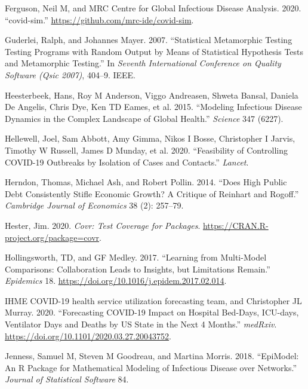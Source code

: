 \documentclass[]{elsarticle} %
\begin{document}
\leavevmode\hypertarget{ref-ferg_github}{}%
Ferguson, Neil M, and MRC Centre for Global Infectious Disease Analysis. 2020. ``covid-sim.'' \url{https://github.com/mrc-ide/covid-sim}.

\leavevmode\hypertarget{ref-guderlei2007statistical}{}%
Guderlei, Ralph, and Johannes Mayer. 2007. ``Statistical Metamorphic Testing Testing Programs with Random Output by Means of Statistical Hypothesis Tests and Metamorphic Testing.'' In \emph{Seventh International Conference on Quality Software (Qsic 2007)}, 404--9. IEEE.

\leavevmode\hypertarget{ref-heesterbeek2015modeling}{}%
Heesterbeek, Hans, Roy M Anderson, Viggo Andreasen, Shweta Bansal, Daniela De Angelis, Chris Dye, Ken TD Eames, et al. 2015. ``Modeling Infectious Disease Dynamics in the Complex Landscape of Global Health.'' \emph{Science} 347 (6227).

\leavevmode\hypertarget{ref-hellewell2020feasibility}{}%
Hellewell, Joel, Sam Abbott, Amy Gimma, Nikos I Bosse, Christopher I Jarvis, Timothy W Russell, James D Munday, et al. 2020. ``Feasibility of Controlling COVID-19 Outbreaks by Isolation of Cases and Contacts.'' \emph{Lancet}.

\leavevmode\hypertarget{ref-herndon2014does}{}%
Herndon, Thomas, Michael Ash, and Robert Pollin. 2014. ``Does High Public Debt Consistently Stifle Economic Growth? A Critique of Reinhart and Rogoff.'' \emph{Cambridge Journal of Economics} 38 (2): 257--79.

\leavevmode\hypertarget{ref-covr}{}%
Hester, Jim. 2020. \emph{Covr: Test Coverage for Packages}. \url{https://CRAN.R-project.org/package=covr}.

\leavevmode\hypertarget{ref-hollingsworth2017learning}{}%
Hollingsworth, TD, and GF Medley. 2017. ``Learning from Multi-Model Comparisons: Collaboration Leads to Insights, but Limitations Remain.'' \emph{Epidemics} 18. \url{https://doi.org/10.1016/j.epidem.2017.02.014}.

\leavevmode\hypertarget{ref-ihme}{}%
IHME COVID-19 health service utilization forecasting team, and Christopher JL Murray. 2020. ``Forecasting COVID-19 Impact on Hospital Bed-Days, ICU-days, Ventilator Days and Deaths by US State in the Next 4 Months.'' \emph{medRxiv}. \url{https://doi.org/10.1101/2020.03.27.20043752}.

\leavevmode\hypertarget{ref-jenness2018epimodel}{}%
Jenness, Samuel M, Steven M Goodreau, and Martina Morris. 2018. ``EpiModel: An R Package for Mathematical Modeling of Infectious Disease over Networks.'' \emph{Journal of Statistical Software} 84.
\end{document}
